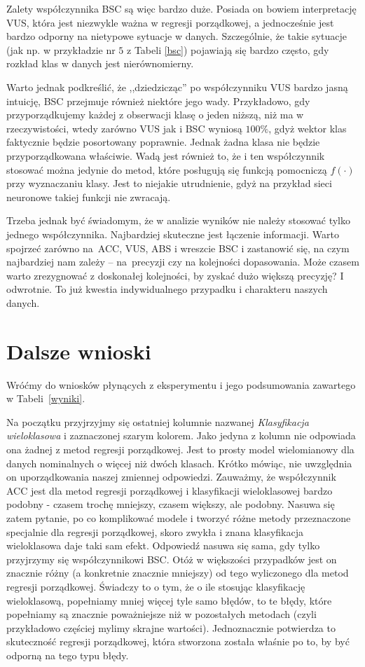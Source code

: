 \documentclass{mini}
\begin{document}
Zalety współczynnika BSC są więc bardzo duże. Posiada on bowiem interpretację VUS, która jest niezwykle ważna w regresji porządkowej, a jednocześnie jest bardzo odporny na nietypowe sytuacje w danych. Szczególnie, że takie sytuacje (jak np. w przykładzie nr $5$ z Tabeli \ref{bsc}) pojawiają się bardzo często, gdy rozkład klas w danych jest nierównomierny. 

Warto jednak podkreślić, że ,,dziedzicząc'' po współczynniku VUS bardzo jasną intuicję, BSC przejmuje również niektóre jego wady. Przykładowo, gdy przyporządkujemy każdej z obserwacji klasę o jeden niższą, niż ma w rzeczywistości, wtedy zarówno VUS jak i BSC wyniosą $100\%$, gdyż wektor klas faktycznie będzie posortowany poprawnie. Jednak żadna klasa nie będzie przyporządkowana właściwie. Wadą jest również to, że i ten współczynnik stosować można jedynie do metod, które posługują się funkcją pomocniczą $f(\cdot)$ przy wyznaczaniu klasy. Jest to niejakie utrudnienie, gdyż na przykład sieci neuronowe takiej funkcji nie zwracają.

Trzeba jednak być świadomym, że w analizie wyników nie należy stosować tylko jednego współczynnika. Najbardziej skuteczne jest łączenie informacji. Warto spojrzeć zarówno na~ACC, VUS, ABS i wreszcie BSC i zastanowić się, na czym najbardziej nam zależy -- na~precyzji czy na kolejności dopasowania. Może czasem warto zrezygnować z doskonałej kolejności, by zyskać dużo większą precyzję? I odwrotnie. To już kwestia indywidualnego przypadku i charakteru naszych danych. 

\section{Dalsze wnioski}

Wróćmy do wniosków płynących z eksperymentu i jego podsumowania zawartego w Tabeli~\ref{wyniki}.

Na początku przyjrzyjmy się ostatniej kolumnie nazwanej \textit{Klasyfikacja wieloklasowa} i zaznaczonej szarym kolorem. Jako jedyna z kolumn nie odpowiada ona żadnej z metod regresji porządkowej. Jest to prosty model wielomianowy dla danych nominalnych o więcej niż dwóch klasach. Krótko mówiąc, nie uwzględnia on uporządkowania naszej zmiennej odpowiedzi. Zauważmy, że współczynnik ACC jest dla metod regresji porządkowej i klasyfikacji wieloklasowej bardzo podobny - czasem trochę mniejszy, czasem większy, ale podobny. Nasuwa się zatem pytanie, po co komplikować modele i tworzyć różne metody przeznaczone specjalnie dla regresji porządkowej, skoro zwykła i znana klasyfikacja wieloklasowa daje taki sam efekt. Odpowiedź nasuwa się sama, gdy tylko przyjrzymy się współczynnikowi BSC. Otóż w większości  przypadków jest on znacznie różny (a konkretnie znacznie mniejszy) od tego wyliczonego dla metod regresji porządkowej. Świadczy to o tym, że o ile stosując klasyfikację wieloklasową, popełniamy mniej więcej tyle samo błędów, to te błędy, które popełniamy są znacznie poważniejsze niż w pozostałych metodach (czyli przykładowo częściej mylimy skrajne wartości). Jednoznacznie potwierdza to skuteczność regresji porządkowej, która stworzona została właśnie po to, by być odporną na tego typu błędy.
\end{document}
